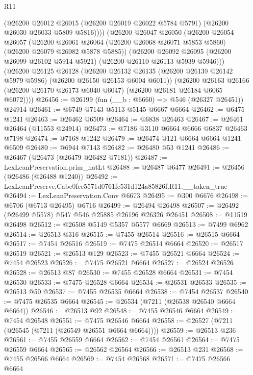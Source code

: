 \begin{lexlean}{R11}
\begin{coremodule}
        (@26200
          @26012
          @26015
          (@26200 @26019 @26022 @5784 @5791)
          (@26200 @26030 @26033 @5809 @5816))))
    (@26200
      @26047
      @26050
      (@26200
        @26054
        @26057
        (@26200 @26061 @26064 (@26200 @26068 @26071 @5853 @5860) (@26200 @26079 @26082 @5878 @5885))
        (@26200
          @26092
          @26095
          (@26200 @26099 @26102 @5914 @5921)
          (@26200 @26110 @26113 @5939 @5946)))
      (@26200
        @26125
        @26128
        (@26200 @26132 @26135 (@26200 @26139 @26142 @5979 @5986) (@26200 @26150 @26153 @6004 @6011))
        (@26200
          @26163
          @26166
          (@26200 @26170 @26173 @6040 @6047)
          (@26200 @26181 @26184 @6065 @6072))))
@26456 := @26199 (fun (__b : @6660) => @546 (@26327 @26451)) @24914
@26461 := @6749 @7143 @5113 @5145 @6667 @6664
@26462 := @6475 @1241
@26463 := @26462 @6509
@26464 := @6838 @26463
@26467 := @26461 @26464 (@11553 @24914)
@26473 := @7186 @3110 @6664 @6666 @6837 @26463 @7198
@26474 := @7168 @1242
@26479 := @26474 @121 @6664 @6664 @1241 @6509
@26480 := @6944 @7143
@26482 := @26480 @53 @1241
@26486 := @26467 (@26473 (@26479 @26482 @7181))
@26487 := LexLeanPreservation.prim_natLt
@26488 := @26487 @6477
@26491 := @26456 (@26486 (@26488 @1240))
@26492 := LexLeanPreserve.Cabc0fce5571d0761fc531d124a85826f.R11.__taken_true
@26494 := LexLeanPreservation.Conv @6673
@26495 := @300 @6676
@26498 := @6706 (@6713 @26495) @6716
@26499 := @26494 @26498
@26507 := @26492 (@26499 @5578) @547 @546 @25885 @26196 @26326 @26451
@26508 := @11519 @26498
@26512 := @26508 @5149 @5357 @5577 @6669
@26513 := @7499 @6962
@26514 := @26513 @316
@26515 := @7455 @26514
@26516 := @26515 @6664
@26517 := @7454 @26516
@26519 := @7475 @26514 @6664
@26520 := @26517 @26519
@26521 := @26513 @129
@26523 := @7455 @26521 @6664
@26524 := @7454 @26523
@26526 := @7475 @26521 @6664
@26527 := @26524 @26526
@26528 := @26513 @87
@26530 := @7455 @26528 @6664
@26531 := @7454 @26530
@26533 := @7475 @26528 @6664
@26534 := @26531 @26533
@26535 := @26513 @50
@26537 := @7455 @26535 @6664
@26538 := @7454 @26537
@26540 := @7475 @26535 @6664
@26545 := @26534 (@7211 (@26538 @26540 @6664 @6664))
@26546 := @26513 @92
@26548 := @7455 @26546 @6664
@26549 := @7454 @26548
@26551 := @7475 @26546 @6664
@26558 := @26527 (@7211 (@26545 (@7211 (@26549 @26551 @6664 @6664))))
@26559 := @26513 @236
@26561 := @7455 @26559 @6664
@26562 := @7454 @26561
@26564 := @7475 @26559 @6664
@26565 := @26562 @26564
@26566 := @26513 @231
@26568 := @7455 @26566 @6664
@26569 := @7454 @26568
@26571 := @7475 @26566 @6664

\end{coremodule}
\end{lexlean}
